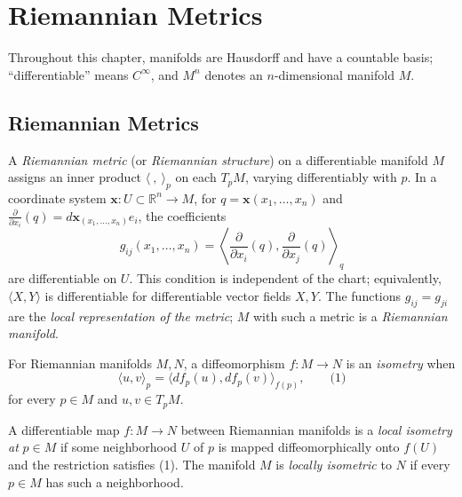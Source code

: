 \chapter{Riemannian Metrics}
\label{chap:dc-riemannian-metrics}

Throughout this chapter, manifolds are Hausdorff and have a countable basis;
``differentiable'' means $C^\infty$, and $M^n$ denotes an $n$-dimensional
manifold $M$.

\section{Riemannian Metrics}

\begin{definition}
  \label{def:dc-ch1-2-1}


  A \emph{Riemannian metric} (or \emph{Riemannian structure}) on a differentiable
  manifold $M$ assigns an inner product $\langle\ ,\ \rangle_p$ on each $T_pM$,
  varying differentiably with $p$. In a coordinate system
  $\mathbf{x}:U\subset\mathbb{R}^n\to M$, for
  $q=\mathbf{x}(x_1,\ldots,x_n)$ and
  $\frac{\partial}{\partial x_i}(q)=d\mathbf{x}_{(x_1,\ldots,x_n)}e_i$,
  the coefficients
  $$
  g_{ij}(x_1,\ldots,x_n)=
  \left\langle\frac{\partial}{\partial x_i}(q),
  \frac{\partial}{\partial x_j}(q)\right\rangle_q
  $$
  are differentiable on $U$. This condition is independent of the chart;
  equivalently, $\langle X,Y\rangle$ is differentiable for differentiable vector
  fields $X,Y$. The functions $g_{ij}=g_{ji}$ are the \emph{local representation
  of the metric}; $M$ with such a metric is a \emph{Riemannian manifold}.
\end{definition}

\begin{definition}[isometry]
  \label{def:dc-ch1-2-2}


  For Riemannian manifolds $M,N$, a diffeomorphism $f:M\to N$ is an
  \emph{isometry} when
  $$
  \langle u,v\rangle_p=\langle df_p(u),df_p(v)\rangle_{f(p)},\qquad\text{(1)}
  $$
  for every $p\in M$ and $u,v\in T_pM$.
\end{definition}

\begin{definition}
  \label{def:dc-ch1-2-3}


  A differentiable map $f:M\to N$ between Riemannian manifolds is a
  \emph{local isometry at} $p\in M$ if some neighborhood $U$ of $p$ is mapped
  diffeomorphically onto $f(U)$ and the restriction satisfies (1). The manifold
  $M$ is \emph{locally isometric} to $N$ if every $p\in M$ has such a neighborhood.
\end{definition}

